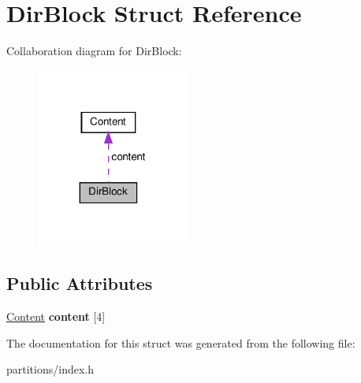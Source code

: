 \hypertarget{structDirBlock}{}\section{Dir\+Block Struct Reference}
\label{structDirBlock}


Collaboration diagram for Dir\+Block\+:\nopagebreak
\begin{figure}[H]
\begin{center}
\leavevmode
\includegraphics[width=143pt]{structDirBlock__coll__graph}
\end{center}
\end{figure}
\subsection*{Public Attributes}
\begin{DoxyCompactItemize}
\item 
\mbox{\label{structDirBlock_a3d5fd85614aa8242ad3d49dcff2ac784}} 
\hyperlink{structContent}{Content} {\bfseries content} \mbox{[}4\mbox{]}
\end{DoxyCompactItemize}


The documentation for this struct was generated from the following file\+:\begin{DoxyCompactItemize}
\item 
partitions/index.\+h\end{DoxyCompactItemize}
